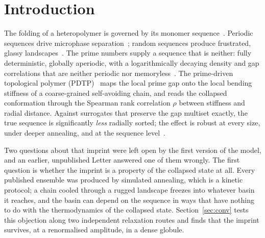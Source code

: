 \documentclass[reprint,amsmath,amssymb,aps,pre,longbibliography]{revtex4-2}
\begin{document}
\maketitle

\section{Introduction}

The folding of a heteropolymer is governed by its monomer sequence~\cite{deGennes,Pande}.
Periodic sequences drive microphase separation~\cite{Leibler,Bates}; random sequences
produce frustrated, glassy landscapes~\cite{Bryngelson,Garel}. The prime numbers supply a
sequence that is neither: fully deterministic, globally aperiodic, with a logarithmically
decaying density and gap correlations that are neither periodic nor
memoryless~\cite{HardyWright,Cramer,HardyLittlewood}. The prime-driven topological polymer
(PDTP)~\cite{PDTP4} maps the local prime gap onto the local bending stiffness of a
coarse-grained self-avoiding chain, and reads the collapsed conformation through the
Spearman rank correlation $\rho$ between stiffness and radial distance. Against surrogates
that preserve the gap multiset exactly, the true sequence is significantly \emph{less}
radially sorted; the effect is robust at every size, under deeper annealing, and at the
sequence level~\cite{PDTP4}.

Two questions about that imprint were left open by the first version of the model, and an
earlier, unpublished Letter answered one of them wrongly. The first question is whether the
imprint is a property of the collapsed state at all. Every published ensemble was produced by
simulated annealing, which is a kinetic protocol; a chain cooled through a rugged landscape
freezes into whatever basin it reaches, and the basin can depend on the sequence in ways that
have nothing to do with the thermodynamics of the collapsed state. Section~\ref{sec:conv}
tests this objection along two independent relaxation routes and finds that the imprint
survives, at a renormalised amplitude, in a dense globule.
\end{document}

